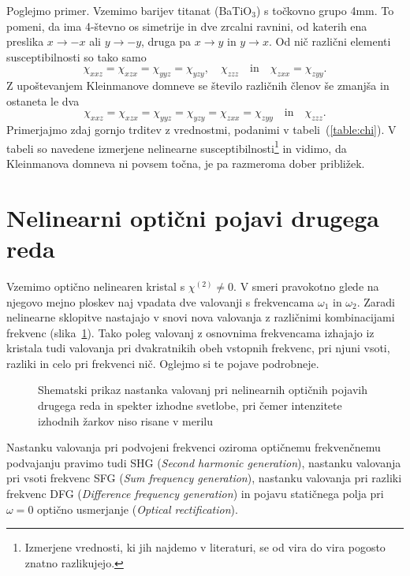Poglejmo primer. 
Vzemimo barijev titanat (BaTiO$_3$) s točkovno grupo 4mm. To pomeni, da
ima 4-števno os simetrije in dve zrcalni ravnini, od katerih ena preslika $x \to -x$ ali $y \to -y$, 
druga pa $x\to y$ in $y\to x$. Od nič različni elementi susceptibilnosti so tako samo
\begin{equation}
\chi_{xxz} = \chi_{xzx} =   \chi_{yyz} = \chi_{yzy}, \quad  \chi_{zzz} \quad \mathrm{in} 
\quad \chi_{zxx} = \chi_{zyy}.   
\end{equation}
Z upoštevanjem Kleinmanove domneve se število različnih členov še zmanjša in ostaneta le dva
\begin{equation}
\chi_{xxz} = \chi_{xzx} = \chi_{yyz} = \chi_{yzy} =\chi_{zxx} = \chi_{zyy} \quad \mathrm{in} \quad \chi_{zzz}.   
\end{equation}
Primerjajmo zdaj gornjo trditev z vrednostmi, podanimi v tabeli~(\ref{table:chi}). V tabeli
so navedene izmerjene nelinearne susceptibilnosti\footnote{Izmerjene vrednosti, 
ki jih najdemo v literaturi, se od vira do vira pogosto znatno razlikujejo.} in vidimo, da Kleinmanova
domneva ni povsem točna, je pa razmeroma dober približek. 

\section{Nelinearni optični pojavi drugega reda}
Vzemimo optično nelinearen kristal s $\chi^{(2)} \neq 0$. V smeri pravokotno 
glede na njegovo mejno ploskev naj vpadata dve valovanji s frekvencama
$\omega_{1}$ in $\omega_{2}$. Zaradi nelinearne sklopitve nastajajo v snovi nova 
valovanja z različnimi kombinacijami frekvenc (slika~\ref{fig:nl2}).
Tako poleg valovanj z osnovnima frekvencama izhajajo iz kristala tudi 
valovanja pri dvakratnikih obeh vstopnih frekvenc, pri njuni vsoti, 
razliki in celo pri frekvenci nič. Oglejmo si te pojave podrobneje.
\\ 

\begin{figure}[h]
\centering
\def\svgwidth{140truemm} 

\caption{Shematski prikaz nastanka valovanj pri nelinearnih optičnih pojavih drugega reda 
in spekter izhodne svetlobe, pri čemer intenzitete izhodnih žarkov niso risane v merilu}
\label{fig:nl2}
\end{figure}

\begin{remark}
Nastanku valovanja pri podvojeni frekvenci oziroma optičnemu frekvenčnemu podvajanju pravimo tudi
SHG ({\it Second harmonic 
generation}), 
nastanku valovanja pri vsoti frekvenc SFG
({\it Sum frequency generation}), 
nastanku valovanja pri razliki frekvenc DFG 
({\it Difference frequency generation}) in pojavu 
statičnega polja pri $\omega = 0$ optično usmerjanje
({\it Optical rectification}).  
\end{remark}

